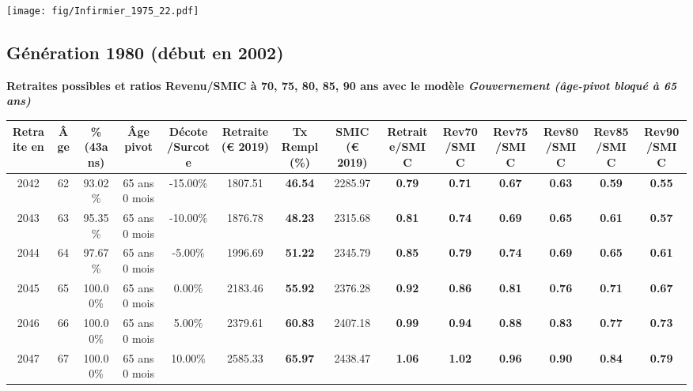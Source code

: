  \begin{center}\texttt{[image: fig/Infirmier\_1975\_22.pdf]}\end{center} \label{fig/Infirmier_1975_22.pdf} 

\newpage 
 
\subsection{Génération 1980 (début en 2002)} 

{\bf \noindent Retraites possibles et ratios Revenu/SMIC à 70, 75, 80, 85, 90 ans avec le modèle \emph{Gouvernement (âge-pivot bloqué à 65 ans)}}  
 
\begin{adjustbox}{max width=\textwidth} 
\begin{tabular}[htb]{|c|c||c|c|c||c|c||c||c|c|c|c|c|c|} 
\hline 
 Retraite en &  Âge &  \%(43ans) &  Âge pivot &  Décote/Surcote &  Retraite (\euro{} 2019) &  Tx Rempl(\%) &  SMIC (\euro{} 2019) &  Retraite/SMIC &  Rev70/SMIC &  Rev75/SMIC &  Rev80/SMIC &  Rev85/SMIC &  Rev90/SMIC \\ 
\hline \hline 
 2042 &  62 &  93.02\% &  65 ans 0 mois &  -15.00\% &  1807.51 &  {\bf 46.54} &  2285.97 &  {\bf {\color{red} 0.79}} &  {\bf {\color{red} 0.71}} &  {\bf {\color{red} 0.67}} &  {\bf {\color{red} 0.63}} &  {\bf {\color{red} 0.59}} &  {\bf {\color{red} 0.55}} \\ 
\hline 
 2043 &  63 &  95.35\% &  65 ans 0 mois &  -10.00\% &  1876.78 &  {\bf 48.23} &  2315.68 &  {\bf {\color{red} 0.81}} &  {\bf {\color{red} 0.74}} &  {\bf {\color{red} 0.69}} &  {\bf {\color{red} 0.65}} &  {\bf {\color{red} 0.61}} &  {\bf {\color{red} 0.57}} \\ 
\hline 
 2044 &  64 &  97.67\% &  65 ans 0 mois &  -5.00\% &  1996.69 &  {\bf 51.22} &  2345.79 &  {\bf {\color{red} 0.85}} &  {\bf {\color{red} 0.79}} &  {\bf {\color{red} 0.74}} &  {\bf {\color{red} 0.69}} &  {\bf {\color{red} 0.65}} &  {\bf {\color{red} 0.61}} \\ 
\hline 
 2045 &  65 &  100.00\% &  65 ans 0 mois &  0.00\% &  2183.46 &  {\bf 55.92} &  2376.28 &  {\bf {\color{red} 0.92}} &  {\bf {\color{red} 0.86}} &  {\bf {\color{red} 0.81}} &  {\bf {\color{red} 0.76}} &  {\bf {\color{red} 0.71}} &  {\bf {\color{red} 0.67}} \\ 
\hline 
 2046 &  66 &  100.00\% &  65 ans 0 mois &  5.00\% &  2379.61 &  {\bf 60.83} &  2407.18 &  {\bf {\color{red} 0.99}} &  {\bf {\color{red} 0.94}} &  {\bf {\color{red} 0.88}} &  {\bf {\color{red} 0.83}} &  {\bf {\color{red} 0.77}} &  {\bf {\color{red} 0.73}} \\ 
\hline 
 2047 &  67 &  100.00\% &  65 ans 0 mois &  10.00\% &  2585.33 &  {\bf 65.97} &  2438.47 &  {\bf 1.06} &  {\bf 1.02} &  {\bf {\color{red} 0.96}} &  {\bf {\color{red} 0.90}} &  {\bf {\color{red} 0.84}} &  {\bf {\color{red} 0.79}} \\ 
\hline 
\hline 
\end{tabular} 
\end{adjustbox} 
 
